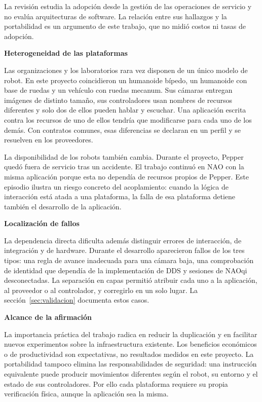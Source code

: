 \documentclass[11pt,letterpaper]{article}
\begin{document}
La revisión estudia la adopción desde la gestión de las operaciones de servicio y no evalúa arquitecturas de software. La relación entre sus hallazgos y la portabilidad es un argumento de este trabajo, que no midió costos ni tasas de adopción.

\par\medskip\noindent\textbf{Heterogeneidad de las plataformas}\par

Las organizaciones y los laboratorios rara vez disponen de un único modelo de robot. En este proyecto coincidieron un humanoide bípedo, un humanoide con base de ruedas y un vehículo con ruedas mecanum. Sus cámaras entregan imágenes de distinto tamaño, sus controladores usan nombres de recursos diferentes y solo dos de ellos pueden hablar y escuchar. Una aplicación escrita contra los recursos de uno de ellos tendría que modificarse para cada uno de los demás. Con contratos comunes, esas diferencias se declaran en un perfil y se resuelven en los proveedores.

La disponibilidad de los robots también cambia. Durante el proyecto, Pepper quedó fuera de servicio tras un accidente. El trabajo continuó en NAO con la misma aplicación porque esta no dependía de recursos propios de Pepper. Este episodio ilustra un riesgo concreto del acoplamiento: cuando la lógica de interacción está atada a una plataforma, la falla de esa plataforma detiene también el desarrollo de la aplicación.

\par\medskip\noindent\textbf{Localización de fallos}\par

La dependencia directa dificulta además distinguir errores de interacción, de integración y de hardware. Durante el desarrollo aparecieron fallos de los tres tipos: una regla de avance inadecuada para una cámara baja, una comprobación de identidad que dependía de la implementación de DDS y sesiones de NAOqi desconectadas. La separación en capas permitió atribuir cada uno a la aplicación, al proveedor o al controlador, y corregirlo en un solo lugar. La sección~\ref{sec:validacion} documenta estos casos.

\par\medskip\noindent\textbf{Alcance de la afirmación}\par

La importancia práctica del trabajo radica en reducir la duplicación y en facilitar nuevos experimentos sobre la infraestructura existente. Los beneficios económicos o de productividad son expectativas, no resultados medidos en este proyecto. La portabilidad tampoco elimina las responsabilidades de seguridad: una instrucción equivalente puede producir movimientos diferentes según el robot, su entorno y el estado de sus controladores. Por ello cada plataforma requiere su propia verificación física, aunque la aplicación sea la misma.
\end{document}
